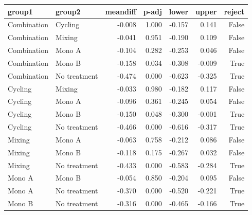 \begin{tabular}{llrrrrr}
\toprule
group1 & group2 & meandiff & p-adj & lower & upper & reject \\
\midrule
Combination & Cycling & -0.008 & 1.000 & -0.157 & 0.141 & False \\
Combination & Mixing & -0.041 & 0.951 & -0.190 & 0.109 & False \\
Combination & Mono A & -0.104 & 0.282 & -0.253 & 0.046 & False \\
Combination & Mono B & -0.158 & 0.034 & -0.308 & -0.009 & True \\
Combination & No treatment & -0.474 & 0.000 & -0.623 & -0.325 & True \\
Cycling & Mixing & -0.033 & 0.980 & -0.182 & 0.117 & False \\
Cycling & Mono A & -0.096 & 0.361 & -0.245 & 0.054 & False \\
Cycling & Mono B & -0.150 & 0.048 & -0.300 & -0.001 & True \\
Cycling & No treatment & -0.466 & 0.000 & -0.616 & -0.317 & True \\
Mixing & Mono A & -0.063 & 0.758 & -0.212 & 0.086 & False \\
Mixing & Mono B & -0.118 & 0.175 & -0.267 & 0.032 & False \\
Mixing & No treatment & -0.433 & 0.000 & -0.583 & -0.284 & True \\
Mono A & Mono B & -0.054 & 0.850 & -0.204 & 0.095 & False \\
Mono A & No treatment & -0.370 & 0.000 & -0.520 & -0.221 & True \\
Mono B & No treatment & -0.316 & 0.000 & -0.465 & -0.166 & True \\
\bottomrule
\end{tabular}
